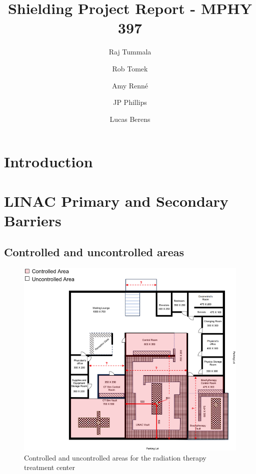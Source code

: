 \documentclass[%
aps,
mph,%
amsmath,amssymb,
preprint,%
tightenlines,
longbibliography,
superscriptaddress,
floatfix,
nofootinbib,
]{revtex4-2}
\begin{document}
\title{Shielding Project Report - MPHY 397}


\author{Raj Tummala}

\author{Rob Tomek}

\author{Amy Renn\'{e}}

\author{JP Phillips}

\author{Lucas Berens}

\maketitle


\section{Introduction}
\section{LINAC Primary and Secondary Barriers}
    \subsection{Controlled and uncontrolled areas}
    \begin{figure}[h!]
        \centering
        \includegraphics[width=0.75\linewidth]{figures/controlled areas.png}
        \caption{Controlled and uncontrolled areas for the radiation therapy treatment center}
        \label{controll}
    \end{figure}
\end{document}
